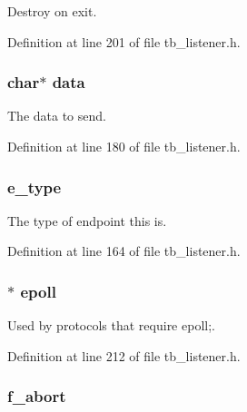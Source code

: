 Destroy on exit. 



Definition at line 201 of file tb\-\_\-listener.\-h.

\hypertarget{structtb__listener__t_a91a70b77df95bd8b0830b49a094c2acb}{
\subsubsection[{data}]{\setlength{\rightskip}{0pt plus 5cm}char$\ast$ data}}\label{structtb__listener__t_a91a70b77df95bd8b0830b49a094c2acb}


The data to send. 



Definition at line 180 of file tb\-\_\-listener.\-h.

\hypertarget{structtb__listener__t_abbd1eee27b1b57dcb1f57b2ef4b4fa12}{
\subsubsection[{e\-\_\-type}]{ e\-\_\-type}}\label{structtb__listener__t_abbd1eee27b1b57dcb1f57b2ef4b4fa12}


The type of endpoint this is. 



Definition at line 164 of file tb\-\_\-listener.\-h.

\hypertarget{structtb__listener__t_af7fbbda1b15f6051fb8cead0ada5ce7e}{
\subsubsection[{epoll}]{$\ast$ epoll}}\label{structtb__listener__t_af7fbbda1b15f6051fb8cead0ada5ce7e}


Used by protocols that require epoll;. 



Definition at line 212 of file tb\-\_\-listener.\-h.

\hypertarget{structtb__listener__t_a385e4cbcf683dd35d7d80c9726c8c67d}{
\subsubsection[{f\-\_\-abort}]{ f\-\_\-abort}}\label{structtb__listener__t_a385e4cbcf683dd35d7d80c9726c8c67d}



